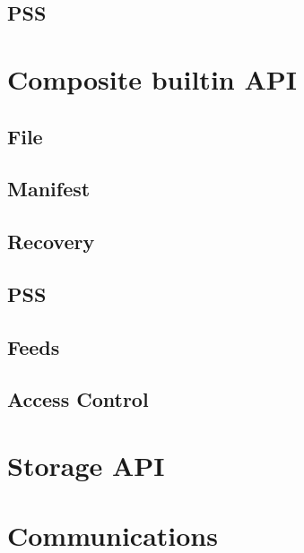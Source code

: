 \subsection{PSS \statusorange}\label{spec:api:trojan}


\section{Composite builtin API \statusorange}\label{spec:api:builtin}

\subsection{File \statusorange}\label{spec:api:file}

\subsection{Manifest \statusorange}\label{spec:api:manifest}

\subsection{Recovery\statusorange}\label{spec:api:recovery}

\subsection{PSS \statusorange}\label{spec:api:pss}

\subsection{Feeds \statusorange}\label{spec:api:feeds}

\subsection{Access Control  \statusorange}\label{spec:api:access-control}




\section{Storage API \statusred}\label{spec:api:storage}



\section{Communications  \statusred}\label{spec:api:communications}



